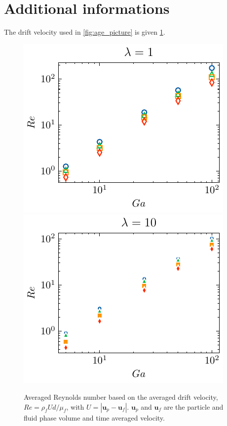 \section{Additional informations}
\label{ap:age}

The drift velocity used in \ref{fig:age_picture} is given \ref{fig:Reall}.
\begin{figure}[h!]
    \centering
    \includegraphics[height = 0.3\textwidth]{image/HOMOGENEOUS_NEW/CA/Re_l_1.pdf}
    \includegraphics[height = 0.3\textwidth]{image/HOMOGENEOUS_NEW/CA/Re_l_10.pdf}
    \caption{
        Averaged Reynolds number based on the averaged drift velocity, $Re = \rho_fU d /\mu_f$, with $U = |\textbf{u}_p - \textbf{u}_f|$.
        $\textbf{u}_p$ and $\textbf{u}_f$ are the particle and fluid phase volume and time averaged velocity.
    }
    \label{fig:Reall}
\end{figure}


